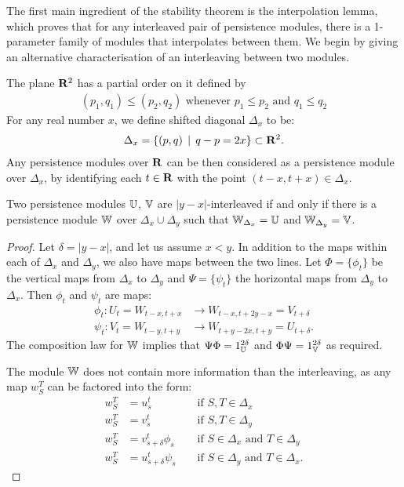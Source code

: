 The first main ingredient of the stability theorem is the interpolation lemma, which proves that for any interleaved pair of persistence modules, there is a 1-parameter family of modules that interpolates between them. We begin by giving an alternative characterisation of an interleaving between two modules.

The plane $\mathbf{R}^2$ has a partial order on it defined by 
\begin{align*}
(p_1, q_1) \leq (p_2, q_2) \text{ whenever } p_1 \leq p_2 \text{ and } q_1 \leq q_2
\end{align*}
For any real number $x$, we define shifted diagonal $\Delta_x$ to be:
\begin{align*}
\Delta_x = \{ (p, q) \, \mid \, q-p=2x \} \subset \mathbf{R}^2.
\end{align*}
Any persistence modules over $\mathbf{R}$ can be then considered as a persistence module over $\Delta_x$, by identifying each $t \in \mathbf{R}$ with the point $(t-x, t+x) \in \Delta_x$. 

\begin{proposition}
Two persistence modules $\mathbb{U}$, $\mathbb{V}$ are $|y-x|$-interleaved if and only if there is a persistence module $\mathbb{W}$ over $\Delta_x \cup \Delta_y$ such that $\mathbb{W}_{\Delta_x} = \mathbb{U}$ and $\mathbb{W}_{\Delta_y} = \mathbb{V}$.
\end{proposition}
\begin{proof}
Let $\delta = |y-x|$, and let us assume $x < y$. In addition to the maps within each of $\Delta_x$ and $\Delta_y$, we also have maps between the two lines. Let $\Phi = \{\phi_t\}$ be the vertical maps from $\Delta_x$ to $\Delta_y$ and $\Psi = \{\psi_t\}$ the horizontal maps from $\Delta_y$ to $\Delta_x$. Then $\phi_t$ and $\psi_t$ are maps:
\begin{align*}
\phi_t : U_t = W_{t-x, t+x} &\to W_{t-x, t+2y-x} = V_{t+\delta}\\
\psi_t : V_t = W_{t-y, t+y} &\to W_{t+y-2x, t+y} = U_{t+\delta}.
\end{align*}
The composition law for $\mathbb{W}$ implies that $\Psi\Phi=1_{\mathbb{U}}^{2\delta}$ and $\Phi\Psi=1_{\mathbb{V}}^{2\delta}$ as required.

The module $\mathbb{W}$ does not contain more information than the interleaving, as any map $w_S^T$ can be factored into the form:
\begin{align*}
w_S^T &= u_s^t &&\text{ if } S, T \in \Delta_x \\
w_S^T &= v_s^t &&\text{ if } S, T \in \Delta_y \\
w_S^T &= v_{s+\delta}^t \phi_s &&\text{ if } S \in \Delta_x \text{ and } T \in \Delta_y \\
w_S^T &= u_{s+\delta}^t \psi_s &&\text{ if } S \in \Delta_y \text{ and } T \in \Delta_x.
\end{align*}
\end{proof}

